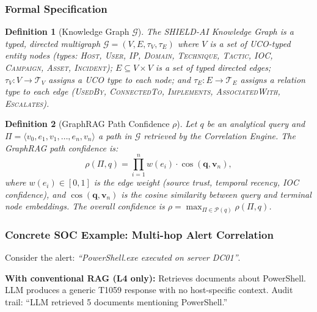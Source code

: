 \documentclass[journal]{IEEEtran}
\newtheorem{definition}{Definition}
\begin{document}
\subsubsection{Formal Specification}

\begin{definition}[Knowledge Graph $\mathcal{G}$]
\label{def:kg}
The SHIELD-AI Knowledge Graph is a typed, directed multigraph
$\mathcal{G} = (V, E, \tau_V, \tau_E)$ where $V$ is a set of UCO-typed entity nodes
(types: \textsc{Host}, \textsc{User}, \textsc{IP}, \textsc{Domain}, \textsc{Technique},
\textsc{Tactic}, \textsc{IOC}, \textsc{Campaign}, \textsc{Asset}, \textsc{Incident});
$E \subseteq V \times V$ is a set of typed directed edges;
$\tau_V: V \to \mathcal{T}_V$ assigns a UCO type to each node; and
$\tau_E: E \to \mathcal{T}_E$ assigns a relation type to each edge
(\textsc{UsedBy}, \textsc{ConnectedTo}, \textsc{Implements},
\textsc{AssociatedWith}, \textsc{Escalates}).
\end{definition}

\begin{definition}[GraphRAG Path Confidence $\rho$]
\label{def:graphrag}
Let $q$ be an analytical query and $\Pi = \langle v_0, e_1, v_1, \dots, e_n, v_n \rangle$
a path in $\mathcal{G}$ retrieved by the Correlation Engine. The GraphRAG path confidence is:
\begin{equation}
\rho(\Pi, q) = \prod_{i=1}^{n} w(e_i) \cdot \cos(\mathbf{q}, \mathbf{v}_n),
\label{eq:rho}
\end{equation}
where $w(e_i) \in [0,1]$ is the edge weight (source trust, temporal recency, IOC confidence),
and $\cos(\mathbf{q}, \mathbf{v}_n)$ is the cosine similarity between query and terminal
node embeddings. The overall confidence is
$\rho = \max_{\Pi \in \mathcal{P}(q)} \rho(\Pi, q)$.
\end{definition}

\subsubsection{Concrete SOC Example: Multi-hop Alert Correlation}
Consider the alert: \emph{``PowerShell.exe executed on server DC01''}.

\noindent\textbf{With conventional RAG (L4 only):} Retrieves documents about PowerShell.
LLM produces a generic T1059 response with no host-specific context. Audit trail: ``LLM
retrieved 5 documents mentioning PowerShell.''
\end{document}
